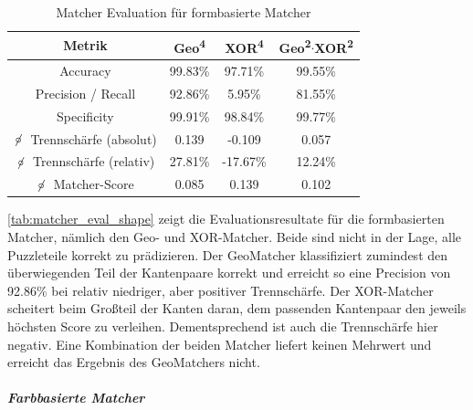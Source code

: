 \begin{table}
    \centering
    \begin{tabular}{||c|ccc||}
        \hline
        Metrik & Geo\textsuperscript{4} & XOR\textsuperscript{4} & Geo\textsuperscript{2}$\cdot$XOR\textsuperscript{2} \\
        \hline\hline
        Accuracy                                 & 99.83\% & 97.71\%   & 99.55\%  \\
        Precision / Recall                       & 92.86\% & 5.95\%    & 81.55\%  \\
        Specificity                              & 99.91\% & 98.84\%   & 99.77\%  \\
        $\not\!\circ \;$ Trennschärfe (absolut)  & 0.139   & -0.109    & 0.057   \\
        $\not\!\circ \;$ Trennschärfe (relativ)  & 27.81\%  & -17.67\%  & 12.24\%  \\
        $\not\!\circ \;$ Matcher-Score           & 0.085   & 0.139     & 0.102   \\
        \hline
    \end{tabular}
    \caption{Matcher Evaluation für formbasierte Matcher}
    \label{tab:matcher_eval_shape}
\end{table}

\autoref{tab:matcher_eval_shape} zeigt die Evaluationsresultate für die formbasierten Matcher, nämlich den Geo- und XOR-Matcher. Beide sind nicht in der Lage, alle Puzzleteile
korrekt zu prädizieren. Der GeoMatcher klassifiziert zumindest den
überwiegenden Teil der Kantenpaare korrekt und erreicht so eine
Precision von 92.86\% bei relativ niedriger, aber positiver
Trennschärfe. Der XOR-Matcher scheitert beim Großteil der Kanten daran,
dem passenden Kantenpaar den jeweils höchsten Score zu verleihen.
Dementsprechend ist auch die Trennschärfe hier negativ. Eine Kombination
der beiden Matcher liefert keinen Mehrwert und erreicht das Ergebnis des
GeoMatchers nicht.

\subparagraph{Farbbasierte Matcher}

